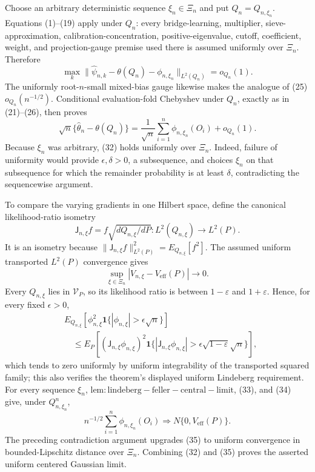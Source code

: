 Choose an arbitrary deterministic sequence \(\xi_n\in\Xi_n\) and put \(Q_n=Q_{n,\xi_n}\).  Equations (1)--(19) apply under \(Q_n\): every bridge-learning, multiplier, sieve-approximation, calibration-concentration, positive-eigenvalue, cutoff, coefficient, weight, and projection-gauge premise used there is assumed uniformly over \(\Xi_n\).  Therefore
\[
 \max_k\|\widehat\psi_{n,k}-\theta(Q_n)-\phi_{n,\xi_n}\|_{L^2(Q_n)}
 =o_{Q_n}(1).                                                               \tag{31}
\]
The uniformly root-\(n\)-small mixed-bias gauge likewise makes the analogue of (25) \(o_{Q_n}(n^{-1/2})\).  Conditional evaluation-fold Chebyshev under \(Q_n\), exactly as in (21)--(26), then proves
\[
 \sqrt n\{\widehat\theta_n-\theta(Q_n)\}
 =\frac1{\sqrt n}\sum_{i=1}^n\phi_{n,\xi_n}(O_i)+o_{Q_n}(1).              \tag{32}
\]
Because \(\xi_n\) was arbitrary, (32) holds uniformly over \(\Xi_n\).  Indeed, failure of uniformity would provide \(\epsilon,\delta>0\), a subsequence, and choices \(\xi_n\) on that subsequence for which the remainder probability is at least \(\delta\), contradicting the sequencewise argument.

To compare the varying gradients in one Hilbert space, define the canonical likelihood-ratio isometry
\[
 \mathsf J_{n,\xi}f=f\sqrt{dQ_{n,\xi}/dP}:L^2(Q_{n,\xi})\longrightarrow L^2(P).
\]
It is an isometry because
\(\|\mathsf J_{n,\xi}f\|_{L^2(P)}^2=E_{Q_{n,\xi}}[f^2]\).  The assumed uniform transported \(L^2(P)\) convergence gives
\[
 \sup_{\xi\in\Xi_n}|V_{n,\xi}-V_{\mathrm{eff}}(P)|\longrightarrow0.       \tag{33}
\]
Every \(Q_{n,\xi}\) lies in \(\mathcal V_P\), so its likelihood ratio is between \(1-\varepsilon\) and \(1+\varepsilon\).  Hence, for every fixed \(\epsilon>0\),
\[
\begin{aligned}
 &E_{Q_{n,\xi}}[\phi_{n,\xi}^2
       \mathbf 1\{|\phi_{n,\xi}|>\epsilon\sqrt n\}]\\
 &\quad\le E_P[(\mathsf J_{n,\xi}\phi_{n,\xi})^2
       \mathbf 1\{|\mathsf J_{n,\xi}\phi_{n,\xi}|
       >\epsilon\sqrt{1-\varepsilon}\sqrt n\}],
                                                                                \tag{34}
\end{aligned}
\]
which tends to zero uniformly by uniform integrability of the transported squared family; this also verifies the theorem's displayed uniform Lindeberg requirement.  For every sequence \(\xi_n\), \(\mathrm{lem:lindeberg-feller-central-limit}\), (33), and (34) give, under \(Q_{n,\xi_n}^n\),
\[
 n^{-1/2}\sum_{i=1}^n\phi_{n,\xi_n}(O_i)
 \Rightarrow N\{0,V_{\mathrm{eff}}(P)\}.                                  \tag{35}
\]
The preceding contradiction argument upgrades (35) to uniform convergence in bounded-Lipschitz distance over \(\Xi_n\).  Combining (32) and (35) proves the asserted uniform centered Gaussian limit.

